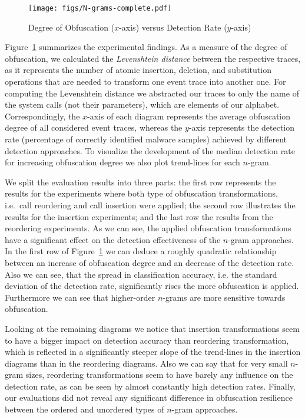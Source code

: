 \documentclass{llncs}
\begin{document}
\begin{figure}[t!]
		\vspace{-2em}
				\begin{center}
         \texttt{[image: figs/N-grams-complete.pdf]}

        \caption{Degree of Obfuscation ($x$-axis) versus Detection Rate ($y$-axis)}

				\label{fig:obfuscation_results}
				\end{center}
\end{figure}


Figure~\ref{fig:obfuscation_results} summarizes the experimental findings. As a measure of the degree of obfuscation, we calculated the \emph{Levenshtein distance} between the respective traces, as it represents the number of atomic insertion, deletion, and substitution operations that are needed to transform one event trace into another one.
For computing the Levenshtein distance we abstracted our traces to only the name of the system calls (not their parameters), which are elements of our alphabet.
Correspondingly, the $x$-axis of each diagram represents the average obfuscation degree of all considered event traces, whereas the $y$-axis represents the detection rate (percentage of correctly identified malware samples) achieved by different detection approaches. To visualize the development of the median detection rate for increasing obfuscation degree we also plot trend-lines for each $n$-gram.

We split the evaluation results into three parts: the first row represents the results for the experiments where both type of obfuscation transformations, i.e.~call reordering and call insertion were applied; the second row illustrates the results for the insertion experiments; and the last row the results from the reordering experiments.
As we can see, the applied obfuscation transformations have a significant effect on the detection effectiveness of the $n$-gram approaches. In the first row of Figure~\ref{fig:obfuscation_results} we can deduce a roughly quadratic relationship between an increase of obfuscation degree and an decrease of the detection rate. Also we can see, that the spread in classification accuracy, i.e. the standard deviation of the detection rate, significantly rises the more obfuscation is applied. Furthermore we can see that higher-order $n$-grams are more sensitive towards obfuscation.

Looking at the remaining diagrams we notice that insertion transformations seem to have a bigger impact on detection accuracy than reordering transformation, which is reflected in a significantly steeper slope of the trend-lines in the insertion diagrams than in the reordering diagrams.
Also we can say that for very small $n$-gram sizes, reordering transformations seem to have barely any influence on the detection rate, as can be seen by almost constantly high detection rates. 
Finally, our evaluations did not reveal any significant difference in obfuscation resilience between the ordered and unordered types of $n$-gram approaches.
\end{document}
